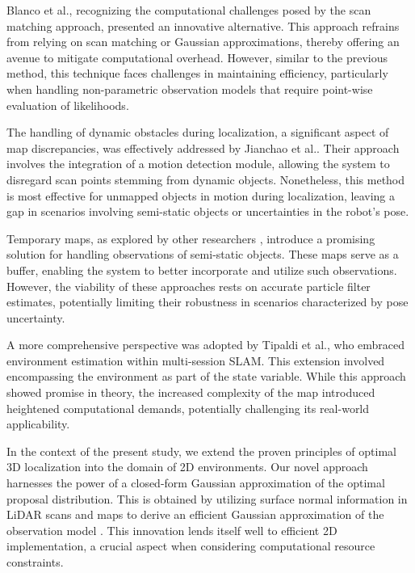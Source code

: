 \documentclass[rnd]{mas_proposal}
\begin{document}
Blanco et al.\cite{article}, recognizing the computational challenges posed by the scan matching approach, presented an innovative alternative. This approach refrains from relying on scan matching or Gaussian approximations, thereby offering an avenue to mitigate computational overhead. However, similar to the previous method, this technique faces challenges in maintaining efficiency, particularly when handling non-parametric observation models that require point-wise evaluation of likelihoods.

The handling of dynamic obstacles during localization, a significant aspect of map discrepancies, was effectively addressed by Jianchao et al.\cite{8028452}. Their approach involves the integration of a motion detection module, allowing the system to disregard scan points stemming from dynamic objects. Nonetheless, this method is most effective for unmapped objects in motion during localization, leaving a gap in scenarios involving semi-static objects or uncertainties in the robot's pose.

Temporary maps, as explored by other researchers \cite{5648920} \cite{6907433}, introduce a promising solution for handling observations of semi-static objects. These maps serve as a buffer, enabling the system to better incorporate and utilize such observations. However, the viability of these approaches rests on accurate particle filter estimates, potentially limiting their robustness in scenarios characterized by pose uncertainty.

A more comprehensive perspective was adopted by Tipaldi et al.\cite{Tipaldi2013LifelongLI}, who embraced environment estimation within multi-session SLAM. This extension involved encompassing the environment as part of the state variable. While this approach showed promise in theory, the increased complexity of the map introduced heightened computational demands, potentially challenging its real-world applicability.

In the context of the present study, we extend the proven principles of optimal 3D localization into the domain of 2D environments. Our novel approach harnesses the power of a closed-form Gaussian approximation of the optimal proposal distribution. This is obtained by utilizing surface normal information in LiDAR scans and maps to derive an efficient Gaussian
approximation of the observation model \cite{10160274}. This innovation lends itself well to efficient 2D implementation, a crucial aspect when considering computational resource constraints.
\end{document}
